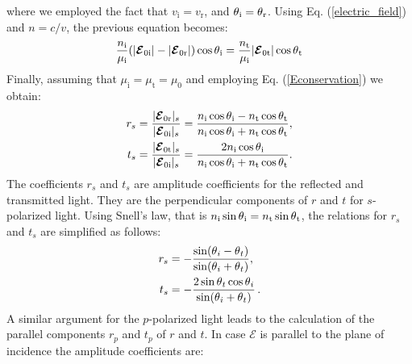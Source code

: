 where we employed the fact that $v_{\textrm{i}}= v_{\textrm{r}}$, and $\mbox{$\theta$}_{\textrm{i}}= \mbox{$\theta$}_{\textrm{r}}$. 
Using Eq. (\ref{electric_field}) and $n = c/v$, the previous equation becomes:
\begin{equation}
\frac{n_{\textrm{i}}}{\mu_{\textrm{i}}}(|\boldsymbol{\mathcal{E}}_{0\textrm{i}}|-|\boldsymbol{\mathcal{E}}_{0\textrm{r}}|)\cos\mbox{$\theta$}_{\textrm{i}} = \frac{n_{\textrm{t}}}{\mu_{\textrm{i}}}|\boldsymbol{\mathcal{E}}_{0\textrm{t}}|\cos\mbox{$\theta$}_{\textrm{t}}
\end{equation}
Finally,  assuming that $\mu_{\textrm{i}}=\mu_{\textrm{t}}=\mu_{0}$ and employing Eq. (\ref{Econservation}) we obtain:
\begin{equation} \label{Fresnel_perpendicular}
\begin{split}
r_{s} & =\frac{|\boldsymbol{\mathcal{E}}_{0 \textrm{r}}|_{s}}{|\boldsymbol{\mathcal{E}}_{0\textrm{i}}|_s} = 
\frac{n_\textrm{i}\cos\mbox{$\theta$}_\textrm{i}-n_\textrm{t} \cos\mbox{$\theta$}_\textrm{t}}{n_\textrm{i}
\cos\mbox{$\theta$}_\textrm{i}+n_\textrm{t}\cos\mbox{$\theta$}_\textrm{t}},\\
t_{s} & = \frac{|\boldsymbol{\mathcal{E}}_{0 \textrm{t}}|_s}{|\boldsymbol{\mathcal{E}}_{0\textrm{i}}|_s} 
=\frac{2n_\textrm{i}\cos\mbox{$\theta$}_\textrm{i}}{n_\textrm{i}\cos\mbox{$\theta$}_\textrm{i}+n_\textrm{t}\cos\mbox{$\theta$}_\textrm{t}}.\\
\end{split}
\end{equation}
The coefficients $r_s$ and $t_s$ are amplitude coefficients for the reflected and transmitted light.
They are the perpendicular components of $r$ and $t$ for $s$-polarized light.
Using Snell's law, that is $n_{\textrm{i}}\sin\mbox{$\theta$}_{\textrm{i}} = n_{\textrm{t}}\sin\mbox{$\theta$}_{\textrm{t}}$, the relations for $r_s$ and $t_s$ are simplified as follows:
\begin{equation} \label{simple_Fresnel}
\begin{split}
r_{s} & = -\frac{\sin(\mbox{$\theta$}_i-\mbox{$\theta$}_t)}{\sin(\mbox{$\theta$}_i+\mbox{$\theta$}_t)},\\
t_{s} & = -\frac{2\sin \mbox{$\theta$}_t \cos \mbox{$\theta$}_i}{\sin(\mbox{$\theta$}_i+\mbox{$\theta$}_t)}\,.
\end{split}
\end{equation}
\indent A similar argument for the $p$-polarized light leads to the calculation of the parallel components $r_p$ and $t_p$ of $r$ and $t$. 
In case $\boldsymbol{\mathcal{E}}$ is parallel to the plane of incidence the amplitude coefficients are:
